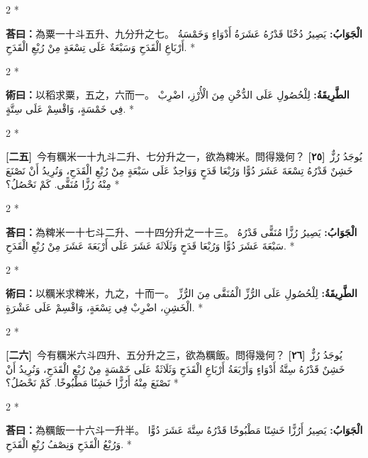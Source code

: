 \documentclass[11pt,a4paper]{article}
\newcommand{\ar}[1]{\arabicfont\beginR #1\endR}
\newcommand{\problemnum}[1]{\textbf{[\ignorespaces#1\unskip]}}
\newenvironment{bilingual}{%
  \begin{paracol}{2}%
  \switchcolumn[0]*%
}{%
  \end{paracol}%
}
\newcommand{\cnline}[1]{\switchcolumn[0]\noindent #1 \switchcolumn[1]}
\newcommand{\arline}[1]{\noindent\ar{#1} \switchcolumn[0]*}
\newenvironment{prob bilingual}{%
  \begin{paracol}{2}%
  \switchcolumn[0]*%
}{%
  \end{paracol}%
  \vspace{0.3em}%
}
\begin{document}
\begin{bilingual}
\cnline{\textcolor{answercolor}{\textbf{荅曰：}}為粟一十斗五升、九分升之七。}
\arline{\textcolor{answercolor}{\textbf{الْجَوَابُ:}} يَصِيرُ دُخْنًا قَدْرُهُ عَشَرَةُ أَدْوَاءٍ وَخَمْسَةُ أَرْبَاعِ الْقَدَحِ وَسَبْعَةٌ عَلَى تِسْعَةٍ مِنْ رُبْعِ الْقَدَحِ.}
\end{bilingual}

\begin{bilingual}
\cnline{%
\textcolor{methodcolor}{\textbf{術曰：}}以稻求粟，五之，六而一。
}
\arline{%
\textcolor{methodcolor}{\textbf{الطَّرِيقَةُ:}} لِلْحُصُولِ عَلَى الدُّخْنِ مِنَ الْأُرْزِ، اضْرِبْ فِي خَمْسَةٍ، وَاقْسِمْ عَلَى سِتَّةٍ.
}
\end{bilingual}

\begin{bilingual}
\cnline{\problemnum{二五}\, 今有糲米一十九斗二升、七分升之一，欲為粺米。問得幾何？}
\arline{\problemnum{٢٥}\, يُوجَدُ رُزٌّ خَشِنٌ قَدْرُهُ تِسْعَةَ عَشَرَ دُوًّا وَرُبْعَا قَدَحٍ وَوَاحِدٌ عَلَى سَبْعَةٍ مِنْ رُبْعِ الْقَدَحِ، وَنُرِيدُ أَنْ نَصْنَعَ مِنْهُ رُزًّا مُنَقًّى. كَمْ نَحْصُلُ؟}
\end{bilingual}

\begin{bilingual}
\cnline{\textcolor{answercolor}{\textbf{荅曰：}}為粺米一十七斗二升、一十四分升之一十三。}
\arline{\textcolor{answercolor}{\textbf{الْجَوَابُ:}} يَصِيرُ رُزًّا مُنَقًّى قَدْرُهُ سَبْعَةَ عَشَرَ دُوًّا وَرُبْعَا قَدَحٍ وَثَلَاثَةَ عَشَرَ عَلَى أَرْبَعَةَ عَشَرَ مِنْ رُبْعِ الْقَدَحِ.}
\end{bilingual}

\begin{bilingual}
\cnline{%
\textcolor{methodcolor}{\textbf{術曰：}}以糲米求粺米，九之，十而一。
}
\arline{%
\textcolor{methodcolor}{\textbf{الطَّرِيقَةُ:}} لِلْحُصُولِ عَلَى الرُّزِّ الْمُنَقَّى مِنَ الرُّزِّ الْخَشِنِ، اضْرِبْ فِي تِسْعَةٍ، وَاقْسِمْ عَلَى عَشْرَةٍ.
}
\end{bilingual}

\begin{bilingual}
\cnline{\problemnum{二六}\, 今有糲米六斗四升、五分升之三，欲為糲飯。問得幾何？}
\arline{\problemnum{٢٦}\, يُوجَدُ رُزٌّ خَشِنٌ قَدْرُهُ سِتَّةُ أَدْوَاءٍ وَأَرْبَعَةُ أَرْبَاعِ الْقَدَحِ وَثَلَاثَةٌ عَلَى خَمْسَةٍ مِنْ رُبْعِ الْقَدَحِ، وَنُرِيدُ أَنْ نَصْنَعَ مِنْهُ أَرُزًّا خَشِنًا مَطْبُوخًا. كَمْ نَحْصُلُ؟}
\end{bilingual}

\begin{bilingual}
\cnline{\textcolor{answercolor}{\textbf{荅曰：}}為糲飯一十六斗一升半。}
\arline{\textcolor{answercolor}{\textbf{الْجَوَابُ:}} يَصِيرُ أَرُزًّا خَشِنًا مَطْبُوخًا قَدْرُهُ سِتَّةَ عَشَرَ دُوًّا وَرُبْعُ الْقَدَحِ وَنِصْفُ رُبْعِ الْقَدَحِ.}
\end{bilingual}
\end{document}
